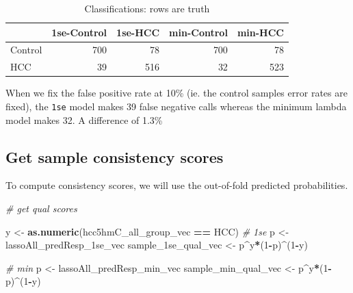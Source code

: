 \documentclass[
]{book}
\newenvironment{Shaded}{\begin{snugshade}}{\end{snugshade}}
\newcommand{\CommentTok}[1]{\textcolor[rgb]{0.56,0.35,0.01}{\textit{#1}}}
\newcommand{\DecValTok}[1]{\textcolor[rgb]{0.00,0.00,0.81}{#1}}
\newcommand{\KeywordTok}[1]{\textcolor[rgb]{0.13,0.29,0.53}{\textbf{#1}}}
\newcommand{\NormalTok}[1]{#1}
\newcommand{\OperatorTok}[1]{\textcolor[rgb]{0.81,0.36,0.00}{\textbf{#1}}}
\newcommand{\StringTok}[1]{\textcolor[rgb]{0.31,0.60,0.02}{#1}}
\begin{document}
\begin{table}

\caption{\label{tab:hcc5hmC-glmnetSuite-get-sample-class}Classifications: rows are truth}
\centering
\begin{tabular}[t]{l|r|r|r|r}
\hline
  & 1se-Control & 1se-HCC & min-Control & min-HCC\\
\hline
Control & 700 & 78 & 700 & 78\\
\hline
HCC & 39 & 516 & 32 & 523\\
\hline
\end{tabular}
\end{table}

When we fix the false positive rate at 10\% (ie. the control samples error rates are fixed),
the \texttt{1se} model makes 39 false negative calls whereas the minimum lambda model makes 32. A difference
of 1.3\%

\hypertarget{get-sample-consistency-scores}{%
\subsection*{Get sample consistency scores}\label{get-sample-consistency-scores}}

To compute consistency scores, we will use the out-of-fold predicted probabilities.

\begin{Shaded}
\begin{Highlighting}[]
\CommentTok{\# get qual scores}

\NormalTok{y <{-}}\StringTok{ }\KeywordTok{as.numeric}\NormalTok{(hcc5hmC\_all\_group\_vec }\OperatorTok{==}\StringTok{ \textquotesingle{}HCC\textquotesingle{}}\NormalTok{)}
\CommentTok{\# 1se}
\NormalTok{p <{-}}\StringTok{ }\NormalTok{lassoAll\_predResp\_1se\_vec}
\NormalTok{sample\_1se\_qual\_vec <{-}}\StringTok{ }\NormalTok{p}\OperatorTok{\^{}}\NormalTok{y}\OperatorTok{*}\NormalTok{(}\DecValTok{1}\OperatorTok{{-}}\NormalTok{p)}\OperatorTok{\^{}}\NormalTok{(}\DecValTok{1}\OperatorTok{{-}}\NormalTok{y)}

\CommentTok{\# min}
\NormalTok{p <{-}}\StringTok{ }\NormalTok{lassoAll\_predResp\_min\_vec}
\NormalTok{sample\_min\_qual\_vec <{-}}\StringTok{ }\NormalTok{p}\OperatorTok{\^{}}\NormalTok{y}\OperatorTok{*}\NormalTok{(}\DecValTok{1}\OperatorTok{{-}}\NormalTok{p)}\OperatorTok{\^{}}\NormalTok{(}\DecValTok{1}\OperatorTok{{-}}\NormalTok{y)}
\end{Highlighting}
\end{Shaded}
\end{document}
